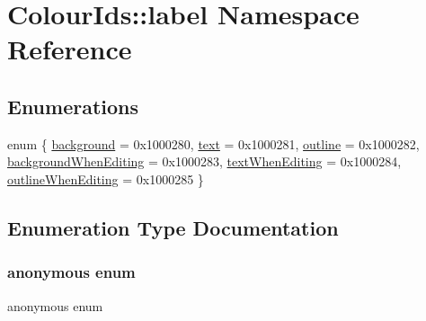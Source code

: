 \hypertarget{namespaceColourIds_1_1label}{}\section{Colour\+Ids\+:\+:label Namespace Reference}
\label{namespaceColourIds_1_1label}
\subsection*{Enumerations}
\begin{DoxyCompactItemize}
\item 
enum \{ \newline
\mbox{\hyperlink{namespaceColourIds_1_1label_a56c2700fb90fc61d99013ff348e30615a64fc099d6df72e432b3bee96fff7dc38}{background}} = 0x1000280, 
\mbox{\hyperlink{namespaceColourIds_1_1label_a56c2700fb90fc61d99013ff348e30615a81a2b95b38d759dc08cf7a2265efb2d1}{text}} = 0x1000281, 
\mbox{\hyperlink{namespaceColourIds_1_1label_a56c2700fb90fc61d99013ff348e30615a92175a57fb5cf3335dfe6f7a0922fb88}{outline}} = 0x1000282, 
\mbox{\hyperlink{namespaceColourIds_1_1label_a56c2700fb90fc61d99013ff348e30615ae29566cf5ab6a16ae167a8b358735baf}{background\+When\+Editing}} = 0x1000283, 
\newline
\mbox{\hyperlink{namespaceColourIds_1_1label_a56c2700fb90fc61d99013ff348e30615a9429165d6486ca218c9845344696ff7e}{text\+When\+Editing}} = 0x1000284, 
\mbox{\hyperlink{namespaceColourIds_1_1label_a56c2700fb90fc61d99013ff348e30615a3ed6ad744e9a807aa4682c3c5279cd6d}{outline\+When\+Editing}} = 0x1000285
 \}
\end{DoxyCompactItemize}


\subsection{Enumeration Type Documentation}
\mbox{\label{namespaceColourIds_1_1label_a56c2700fb90fc61d99013ff348e30615}} 
\subsubsection{\texorpdfstring{anonymous enum}{anonymous enum}}
{\footnotesize\ttfamily anonymous enum}

